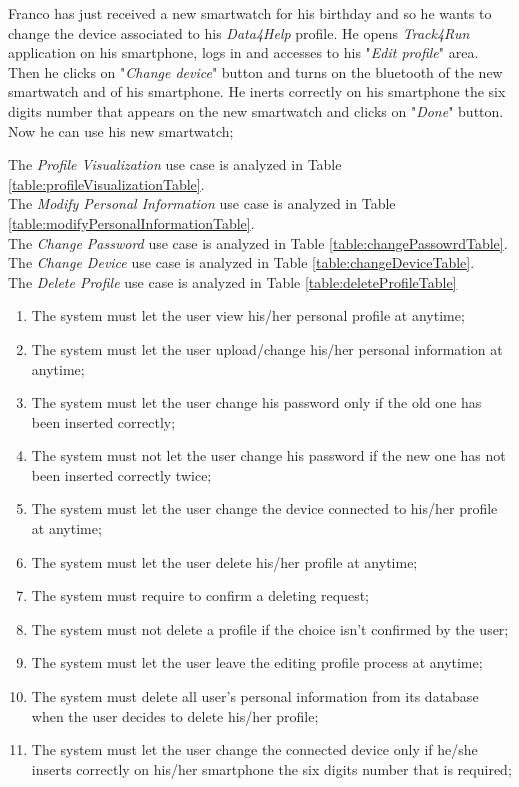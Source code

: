 Franco has just received a new smartwatch for his birthday and so he wants to change the device associated to his \textit{Data4Help} profile. He opens \textit{Track4Run} application on his smartphone, logs in and accesses to his "\textit{Edit profile}" area. Then he clicks on "\textit{Change device}" button and turns on the bluetooth of the new smartwatch and of his smartphone. He inerts correctly on his smartphone the six digits number that appears on the new smartwatch and clicks on "\textit{Done}" button. Now he can use his new smartwatch;

The \textit{Profile Visualization} use case is analyzed in Table \ref{table:profileVisualizationTable}. \\
The \textit{Modify Personal Information} use case is analyzed in Table \ref{table:modifyPersonalInformationTable}. \\
The \textit{Change Password} use case is analyzed in Table \ref{table:changePassowrdTable}. \\
The \textit{Change Device} use case is analyzed in Table \ref{table:changeDeviceTable}. \\
The \textit{Delete Profile} use case is analyzed in Table \ref{table:deleteProfileTable} \\

\begin{enumerate}
  \item The system must let the user view his/her personal profile at anytime;
  \item The system must let the user upload/change his/her personal information at anytime;
  \item The system must let the user change his password only if the old one has been inserted correctly;
  \item The system must not let the user change his password if the new one has not been inserted correctly twice;
  \item The system must let the user change the device connected to his/her profile at anytime;
  \item The system must let the user delete his/her profile at anytime;
  \item The system must require to confirm a deleting request;
  \item The system must not delete a profile if the choice isn't confirmed by the user;
  \item The system must let the user leave the editing profile process at anytime;
  \item The system must delete all user's personal information from its database when the user decides to delete his/her profile;
  \item The system must let the user change the connected device only if he/she inserts correctly on his/her smartphone the six digits number that is required;
\end{enumerate}

